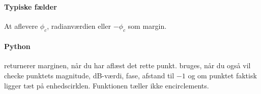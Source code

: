 \paragraph{Typiske fælder}
At aflevere \(\phi_c\), radianværdien eller \(-\phi_c\) som margin.

\paragraph{Python}
 returnerer marginen,
når du har aflæst det rette punkt.
 bruges, når du også vil
checke punktets magnitude, dB-værdi, fase, afstand til \(-1\) og om punktet faktisk
ligger tæt på enhedscirklen. Funktionen tæller ikke encirclements.
